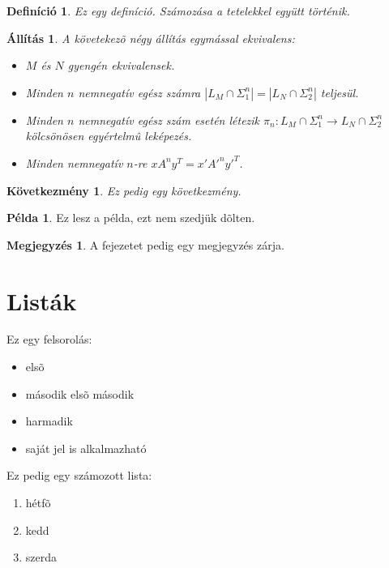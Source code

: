 \documentclass[12pt]{report}
\newtheorem{defi}[tet]{Definíció}
\newtheorem{áll}[tet]{Állítás}
\newtheorem{köv}[tet]{Következmény}
\theoremstyle{definition}
\newtheorem{megj}[tet]{Megjegyzés}
\newtheorem{pld}[tet]{Példa}
\begin{document}
\begin{defi}
\label{def-pelda}
Ez egy definíció. Számozása a tetelekkel együtt történik.
\end{defi}

\begin{áll}
A követekezõ négy állítás egymással ekvivalens:
\label{áll-ekvivalencia}
  \begin{itemize}
  \item[(i)] $M$ és $N$ gyengén ekvivalensek.
  \item[(ii)] Minden $n$
  nemnegatív egész számra $|L_{M}\cap \Sigma_{1}^{n}|=|L_{N}\cap \Sigma_{2}^{n}|$ teljesül.
  \item[(iii)] Minden $n$ nemnegatív egész szám esetén
   létezik
  $ \pi_{n}: L_{M}\cap \Sigma_{1}^{n} \rightarrow L_{N}\cap \Sigma_{2}^{n} $ kölcsönösen egyértelmû
  leképezés.
  \item[(iv)] Minden nemnegatív $n$-re $x A^{n} y^{T}=x' A'^{n} y'^{T}$.
  \end{itemize}
\end{áll}

\begin{köv}
  Ez pedig egy következmény.
\end{köv}

\begin{pld}
  Ez lesz a példa, ezt nem szedjük dõlten.
\end{pld}

\begin{megj}
  A fejezetet pedig egy megjegyzés zárja.
\end{megj}


\section{Listák}

Ez egy felsorolás:
\begin{itemize}
    \item elsõ
    \item második
      \subitem elsõ
      \subitem második
    \item harmadik
    \item[$\clubsuit$]  saját jel is alkalmazható
\end{itemize}
Ez pedig egy számozott lista:
\begin{enumerate}
            \item hétfõ
            \item kedd
            \item szerda
\end{enumerate}
\end{document}
